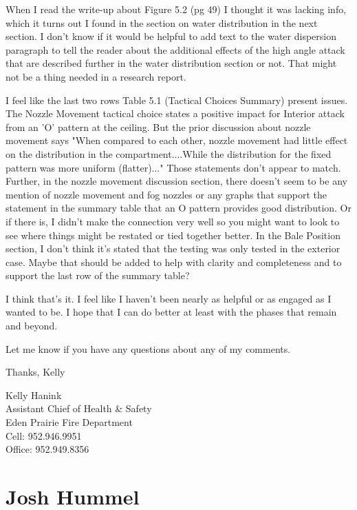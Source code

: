 \documentclass[12pt,oneside]{book}
\begin{document}
\begin{appendix}
When I read the write-up about Figure 5.2 (pg 49) I thought it was lacking info, which it turns out I found in the section on water distribution in the next section.  I don't know if it would be helpful to add text to the water dispersion paragraph to tell the reader about the additional effects of the high angle attack that are described further in the water distribution section or not.  That might not be a thing needed in a research report.
 
I feel like the last two rows Table 5.1 (Tactical Choices Summary) present issues.  The Nozzle Movement tactical choice states a positive impact for Interior attack from an 'O' pattern at the ceiling.  But the prior discussion about nozzle movement says "When compared to each other, nozzle movement had little effect on the distribution in the compartment....While the distribution for the fixed pattern was more uniform (flatter)..."  Those statements don't appear to match.  Further, in the nozzle movement discussion section, there doesn't seem to be any mention of nozzle movement and fog nozzles or any graphs that support the statement in the summary table that an O pattern provides good distribution.  Or if there is, I didn't make the connection very well so you might want to look to see where things might be restated or tied together better.  In the Bale Position section, I don't think it's stated that the testing was only tested in the exterior case.  Maybe that should be added to help with clarity and completeness and to support the last row of the summary table?  
 
I think that's it.  I feel like I haven't been nearly as helpful or as engaged as I wanted to be.  I hope that I can do better at least with the phases that remain and beyond.
 
Let me know if you have any questions about any of my comments.
 
Thanks,
Kelly
 
 
Kelly Hanink \\
Assistant Chief of Health \& Safety \\
Eden Prairie Fire Department \\

Cell: 952.946.9951 \\
Office: 952.949.8356 \\

\section{Josh Hummel}


\end{appendix}
\end{document}
